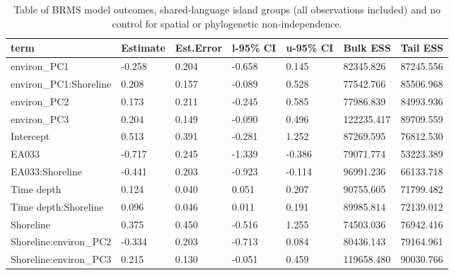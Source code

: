 \begin{table}[ht]
\centering
\begin{tabular}{p{4cm}p{1.65cm}p{1.65cm}p{1.65cm}p{1.65cm}p{1.65cm}p{1.65cm}}
  \toprule
term & Estimate & Est.Error & l-95\% CI & u-95\% CI & Bulk ESS & Tail ESS \\ 
  \midrule
environ\_PC1 & -0.258 & 0.204 & -0.658 & 0.145 & 82345.826 & 87245.556 \\ 
  environ\_PC1:Shoreline & 0.208 & 0.157 & -0.089 & 0.528 & 77542.766 & 85506.968 \\ 
  environ\_PC2 & 0.173 & 0.211 & -0.245 & 0.585 & 77986.839 & 84993.936 \\ 
  environ\_PC3 & 0.204 & 0.149 & -0.090 & 0.496 & 122235.417 & 89709.559 \\ 
  Intercept & 0.513 & 0.391 & -0.281 & 1.252 & 87269.595 & 76812.530 \\ 
  EA033 & -0.717 & 0.245 & -1.339 & -0.386 & 79071.774 & 53223.389 \\ 
  EA033:Shoreline & -0.441 & 0.203 & -0.923 & -0.114 & 96991.236 & 66133.718 \\ 
  Time depth & 0.124 & 0.040 & 0.051 & 0.207 & 90755.605 & 71799.482 \\ 
  Time depth:Shoreline & 0.096 & 0.046 & 0.011 & 0.191 & 89985.814 & 72139.012 \\ 
  Shoreline & 0.375 & 0.450 & -0.516 & 1.255 & 74503.036 & 76942.416 \\ 
  Shoreline:environ\_PC2 & -0.334 & 0.203 & -0.713 & 0.084 & 80436.143 & 79164.961 \\ 
  Shoreline:environ\_PC3 & 0.215 & 0.130 & -0.051 & 0.459 & 119658.480 & 90030.766 \\ 
   \bottomrule
\end{tabular}
\caption{Table of BRMS model outcomes, shared-language island groups (all observations included) and no control for spatial or phylogenetic non-independence.} 
\label{BRMS_effects_medium_control_none}
\end{table}
